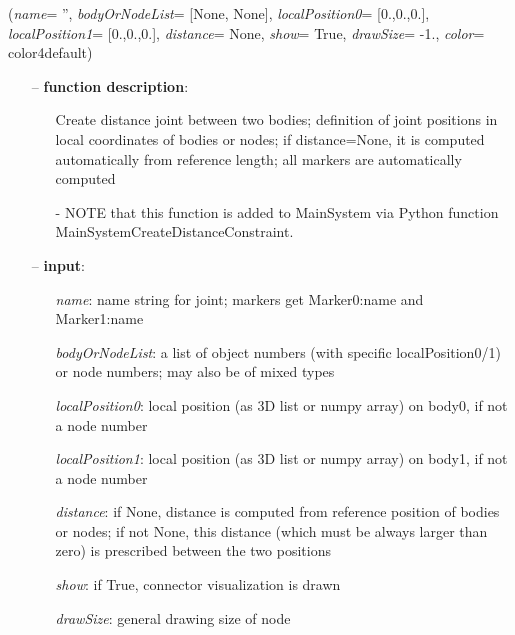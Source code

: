 %
\begin{flushleft}
\label{sec:mainsystemextensions:CreateDistanceConstraint}
({\it name}= '', {\it bodyOrNodeList}= [None, None], {\it localPosition0}= [0.,0.,0.], {\it localPosition1}= [0.,0.,0.], {\it distance}= None, {\it show}= True, {\it drawSize}= -1., {\it color}= color4default)
\end{flushleft}
\setlength{\itemindent}{0.7cm}
\begin{itemize}[leftmargin=0.7cm]
\item[--]
{\bf function description}: \vspace{-6pt}
\begin{itemize}[leftmargin=1.2cm]
\setlength{\itemindent}{-0.7cm}
\item[]Create distance joint between two bodies; definition of joint positions in local coordinates of bodies or nodes; if distance=None, it is computed automatically from reference length; all markers are automatically computed
\item[]- NOTE that this function is added to MainSystem via Python function MainSystemCreateDistanceConstraint.
\end{itemize}
\item[--]
{\bf input}: \vspace{-6pt}
\begin{itemize}[leftmargin=1.2cm]
\setlength{\itemindent}{-0.7cm}
\item[]{\it name}: name string for joint; markers get Marker0:name and Marker1:name
\item[]{\it bodyOrNodeList}: a list of object numbers (with specific localPosition0/1) or node numbers; may also be of mixed types
\item[]{\it localPosition0}: local position (as 3D list or numpy array) on body0, if not a node number
\item[]{\it localPosition1}: local position (as 3D list or numpy array) on body1, if not a node number
\item[]{\it distance}: if None, distance is computed from reference position of bodies or nodes; if not None, this distance (which must be always larger than zero) is prescribed between the two positions
\item[]{\it show}: if True, connector visualization is drawn
\item[]{\it drawSize}: general drawing size of node

\end{itemize}
\end{itemize}
